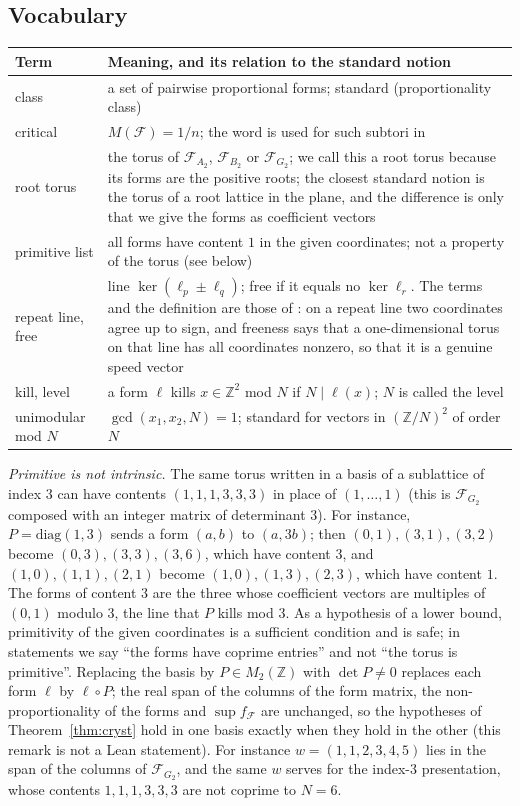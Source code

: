 \documentclass[11pt]{amsart}
\theoremstyle{definition}
\theoremstyle{remark}
\newcommand{\Z}{\mathbb{Z}}
\begin{document}
\subsection{Vocabulary}
\begin{center}
\small
\begin{tabular}{@{}p{2.9cm}p{9.4cm}@{}}
\toprule
Term & Meaning, and its relation to the standard notion\\
\midrule
class & a set of pairwise proportional forms; standard (proportionality class)\\
critical & $M(\mathcal F)=1/n$; the word is used for such subtori in \cite{Cordella,YGB}\\
root torus & the torus of $\mathcal F_{A_2}$, $\mathcal F_{B_2}$ or $\mathcal F_{G_2}$; we call this a root torus because its forms are the positive roots; the closest standard notion is the torus of a root lattice in the plane, and the difference is only that we give the forms as coefficient vectors\\
primitive list & all forms have content $1$ in the given coordinates; not a property of the torus (see below)\\
repeat line, free & line $\ker(\ell_p\pm\ell_q)$; free if it equals no $\ker\ell_r$. The terms and the definition are those of \cite[Section~3]{Cordella}: on a repeat line two coordinates agree up to sign, and freeness says that a one-dimensional torus on that line has all coordinates nonzero, so that it is a genuine speed vector\\
kill, level & a form $\ell$ kills $x\in\Z^2$ mod $N$ if $N\mid\ell(x)$; $N$ is called the level\\
unimodular mod $N$ & $\gcd(x_1,x_2,N)=1$; standard for vectors in $(\Z/N)^2$ of order $N$\\
\bottomrule
\end{tabular}
\end{center}

\emph{Primitive is not intrinsic.} The same torus written in a basis of a sublattice of index $3$ can have contents $(1,1,1,3,3,3)$ in place of $(1,\dots,1)$ (this is $\mathcal F_{G_2}$ composed with an integer matrix of determinant $3$). For instance, $P=\mathrm{diag}(1,3)$ sends a form $(a,b)$ to $(a,3b)$; then $(0,1),(3,1),(3,2)$ become $(0,3),(3,3),(3,6)$, which have content $3$, and $(1,0),(1,1),(2,1)$ become $(1,0),(1,3),(2,3)$, which have content $1$. The forms of content $3$ are the three whose coefficient vectors are multiples of $(0,1)$ modulo $3$, the line that $P$ kills mod $3$. As a hypothesis of a lower bound, primitivity of the given coordinates is a sufficient condition and is safe; in statements we say ``the forms have coprime entries'' and not ``the torus is primitive''. Replacing the basis by $P\in M_2(\Z)$ with $\det P\ne0$ replaces each form $\ell$ by $\ell\circ P$; the real span of the columns of the form matrix, the non-proportionality of the forms and $\sup f_{\mathcal F}$ are unchanged, so the hypotheses of Theorem~\ref{thm:cryst} hold in one basis exactly when they hold in the other (this remark is not a Lean statement). For instance $w=(1,1,2,3,4,5)$ lies in the span of the columns of $\mathcal F_{G_2}$, and the same $w$ serves for the index-$3$ presentation, whose contents $1,1,1,3,3,3$ are not coprime to $N=6$.
\end{document}
